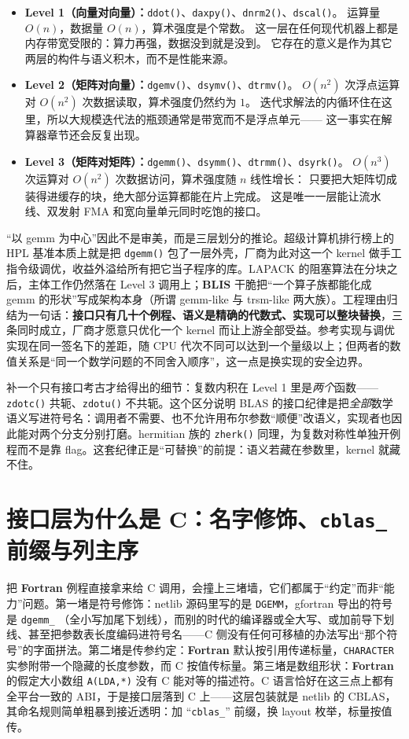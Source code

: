 \documentclass[12pt,a4paper,fontset=fandol]{ctexbook}
\newcommand{\Fn}[1]{\texttt{#1()}}
\newcommand{\Tp}[1]{\texttt{#1}}
\newcommand{\Bk}{\allowbreak}
\newcommand{\Lib}[1]{\textbf{#1}}
\newcommand{\Lang}[1]{\textsf{\bfseries #1}}
\newcommand{\FTN}{\Lang{Fortran}}
\begin{document}
\begin{itemize}
\item \textbf{Level 1（向量对向量）：}\Fn{ddot}、\Fn{daxpy}、\Fn{dnrm2}、\Fn{dscal}。
  运算量 $O(n)$，数据量 $O(n)$，算术强度是个常数。
  这一层在任何现代机器上都是内存带宽受限的：算力再强，数据没到就是没到。
  它存在的意义是作为其它两层的构件与语义积木，而不是性能来源。
\item \textbf{Level 2（矩阵对向量）：}\Fn{dgemv}、\Fn{dsymv}、\Fn{dtrmv}。
  $O(n^2)$ 次浮点运算对 $O(n^2)$ 次数据读取，算术强度仍然约为 $1$。
  迭代求解法的内循环住在这里，所以大规模迭代法的瓶颈通常是带宽而不是浮点单元——
  这一事实在解算器章节还会反复出现。
\item \textbf{Level 3（矩阵对矩阵）：}\Fn{dgemm}、\Fn{dsymm}、\Fn{dtrmm}、\Fn{dsyrk}。
  $O(n^3)$ 次运算对 $O(n^2)$ 次数据访问，算术强度随 $n$ 线性增长：
  只要把大矩阵切成装得进缓存的块，绝大部分运算都能在片上完成。
  这是唯一一层能让流水线、双发射 FMA 和宽向量单元同时吃饱的接口。
\end{itemize}

``以 gemm 为中心''因此不是审美，而是三层划分的推论。超级计算机排行榜上的 HPL 基准本质上就是把 \Fn{dgemm} 包了一层外壳，厂商为此对这一个 kernel 做手工指令级调优，收益外溢给所有把它当子程序的库。LAPACK 的阻塞算法在分块之后，主体工作仍然落在 Level 3 调用上；\Lib{BLIS} 干脆把``一个算子族都能化成 gemm 的形状''写成架构本身（所谓 gemm-like 与 trsm-like 两大族）。工程理由归结为一句话：\textbf{接口只有几十个例程、语义是精确的代数式、实现可以整块替换}，三条同时成立，厂商才愿意只优化一个 kernel 而让上游全部受益。参考实现与调优实现在同一签名下的差距，随 CPU 代次不同可以达到一个量级以上；但两者的数值关系是``同一个数学问题的不同舍入顺序''，这一点是换实现的安全边界。

补一个只有接口考古才给得出的细节：复数内积在 Level 1 里是\emph{两个}函数——\Fn{zdotc} 共轭、\Fn{zdotu} 不共轭。这个区分说明 BLAS 的接口纪律是把\emph{全部}数学语义写进符号名：调用者不需要、也不允许用布尔参数``顺便''改语义，实现者也因此能对两个分支分别打磨。hermitian 族的 \Fn{zherk} 同理，为复数对称性单独开例程而不是靠 flag。这套纪律正是``可替换''的前提：语义若藏在参数里，kernel 就藏不住。

\section{接口层为什么是 C：名字修饰、\Tp{cblas\_} 前缀与列主序}

把 \FTN{} 例程直接拿来给 C 调用，会撞上三堵墙，它们都属于``约定''而非``能力''问题。第一堵是符号修饰：netlib 源码里写的是 \Tp{DGEMM}，gfortran 导出的符号是 \Tp{dgemm\_} \Bk{}（全小写加尾下划线），而别的时代的编译器或全大写、或加前导下划线、甚至把参数表长度编码进符号名——C 侧没有任何可移植的办法写出``那个符号''的字面拼法。第二堵是传参约定：\FTN{} 默认按引用传递标量，\Tp{CHARACTER} 实参附带一个隐藏的长度参数，而 C 按值传标量。第三堵是数组形状：\FTN{} 的假定大小数组 \Tp{A(LDA,*)} \Bk{} 没有 C 能对等的描述符。C 语言恰好在这三点上都有全平台一致的 ABI，于是接口层落到 C 上——这层包装就是 netlib 的 CBLAS，其命名规则简单粗暴到接近透明：加 ``\Tp{cblas\_}'' 前缀，换 layout 枚举，标量按值传。
\end{document}
